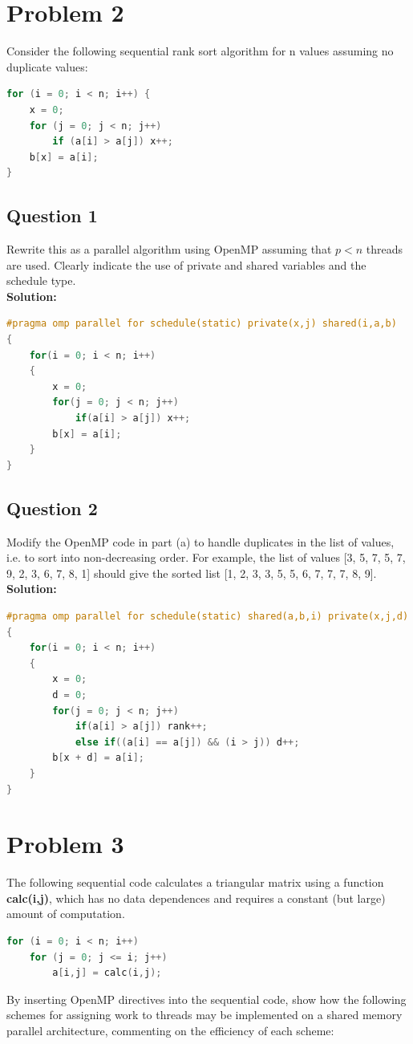 \documentclass{article}
\begin{document}
\section{Problem 2}
Consider the following sequential rank sort algorithm for n values assuming no 
duplicate values: 
\begin{lstlisting}[language=c++]
for (i = 0; i < n; i++) { 
    x = 0; 
    for (j = 0; j < n; j++) 
        if (a[i] > a[j]) x++; 
    b[x] = a[i]; 
} 
\end{lstlisting}
\subsection{Question 1}
Rewrite this as a parallel algorithm using OpenMP assuming that $p < n$ threads are used. Clearly indicate the use of private and shared variables and the schedule type.
\\\textbf{Solution: }
\begin{lstlisting}[language=c++]
#pragma omp parallel for schedule(static) private(x,j) shared(i,a,b)
{
    for(i = 0; i < n; i++)
    {
        x = 0;
        for(j = 0; j < n; j++)
            if(a[i] > a[j]) x++;
        b[x] = a[i];
    }
}
\end{lstlisting} 
\subsection{Question 2}
Modify the OpenMP code in part (a) to handle duplicates in the list of 
values, i.e. to sort into non-decreasing order. For example, the list of values 
[3, 5, 7, 5, 7, 9, 2, 3, 6, 7, 8, 1] should give the sorted list [1, 2, 3, 3, 5, 5, 6, 
7, 7, 7, 8, 9]. 
\\\textbf{Solution: }
\begin{lstlisting}[language=c++]
#pragma omp parallel for schedule(static) shared(a,b,i) private(x,j,d)
{
    for(i = 0; i < n; i++)
    {
        x = 0;
        d = 0;
        for(j = 0; j < n; j++)
            if(a[i] > a[j]) rank++;
            else if((a[i] == a[j]) && (i > j)) d++;
        b[x + d] = a[i];
    }
}
\end{lstlisting} 

\pagebreak

\section{Problem 3}
The following sequential code calculates a triangular matrix using a function \textbf{calc(i,j)}, which has no data dependences and requires a constant (but large) amount of computation. 
\begin{lstlisting}[language=c++]
for (i = 0; i < n; i++) 
    for (j = 0; j <= i; j++) 
        a[i,j] = calc(i,j);
\end{lstlisting}
By inserting OpenMP directives into the sequential code, show how the 
following schemes for assigning work to threads may be implemented on a 
shared memory parallel architecture, commenting on the efficiency of each 
scheme: 
\end{document}
